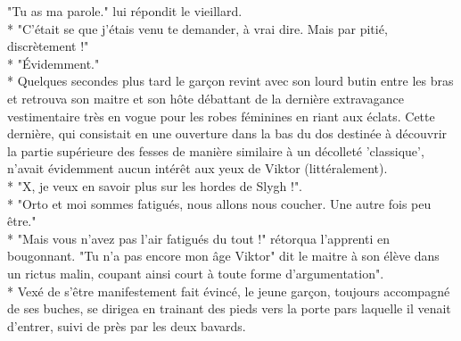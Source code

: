 \documentclass{book}
\begin{document}
"Tu as ma parole." lui répondit le vieillard. \\*
"C'était se que j'étais venu te demander, à vrai dire. Mais par pitié, discrètement !"\\*
"Évidemment."\\*
Quelques secondes plus tard le garçon revint avec son lourd butin entre les bras et retrouva son maitre et son hôte débattant de la dernière extravagance vestimentaire très en vogue pour les robes féminines en riant aux éclats. Cette dernière, qui consistait en une ouverture dans la bas du dos destinée à découvrir la partie supérieure des fesses de manière similaire à un décolleté 'classique', n'avait évidemment aucun intérêt aux yeux de Viktor (littéralement). \\*
"X, je veux en savoir plus sur les hordes de Slygh !".\\*
"Orto et moi sommes fatigués, nous allons nous coucher. Une autre fois peu être."\\*
"Mais vous n'avez pas l'air fatigués du tout !" rétorqua l'apprenti en bougonnant.
"Tu n'a pas encore mon âge Viktor" dit le maitre à son élève dans un rictus malin, coupant ainsi court à toute forme d'argumentation".\\*  	
Vexé de s'être manifestement fait évincé, le jeune garçon, toujours accompagné de ses buches, se dirigea en trainant des pieds vers la porte pars laquelle il venait d'entrer, suivi de près par les deux bavards.



 
\end{document}

